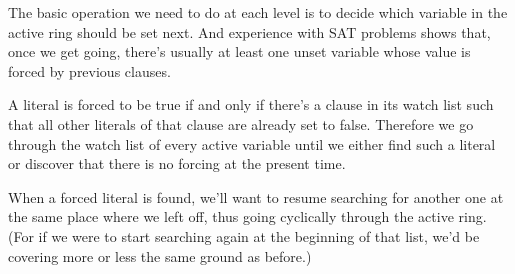 The basic operation we need to do at each level is to decide which
variable in
the active ring should be set next. And experience with SAT problems shows
that, once we get going, there's usually at least one unset variable whose
value is forced by previous clauses.

A literal is forced to be true if and only if there's a clause in its watch
list
such that all other literals of that clause are already set to
false. Therefore we go through the watch list of every active variable until we
either find such a literal or discover that there is no forcing at the present
time.

When a forced literal is found, we'll want to resume searching for another one
at the same place where we left off, thus going cyclically through the active
ring. (For if we were to start searching again at the beginning of that list,
we'd be covering more or less the same ground as before.)

